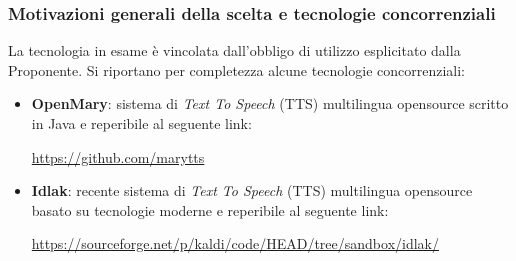 \documentclass[./../Technology Baseline.tex]{subfiles}
\begin{document}
\subsubsection{Motivazioni generali della scelta e tecnologie concorrenziali}

La tecnologia in esame è vincolata dall'obbligo di utilizzo esplicitato dalla Proponente. Si riportano per completezza alcune tecnologie concorrenziali:

\begin{itemize}
	\item \textbf{OpenMary}: sistema di \textit{Text To Speech} (TTS) multilingua opensource scritto in Java e reperibile al seguente link:
	\begin{center}
		\url{https://github.com/marytts}
	\end{center}
	\item \textbf{Idlak}: recente sistema di \textit{Text To Speech} (TTS) multilingua opensource basato su tecnologie moderne e reperibile al seguente link:
	\begin{center}
	\url{https://sourceforge.net/p/kaldi/code/HEAD/tree/sandbox/idlak/}
	\end{center}
\end{itemize}
\end{document}
